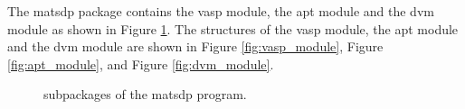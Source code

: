 \documentclass[12pt]{book}
\begin{document}
%
%
%

The matsdp package contains the vasp module, the apt module and the dvm module as shown in Figure \ref{fig:matsdp_main_structure}. The structures of the vasp module, the apt module and the dvm module are shown in Figure \ref{fig:vasp_module}, Figure \ref{fig:apt_module}, and Figure \ref{fig:dvm_module}.

\begin{figure}[htbp]
\centering
{}
\caption{\label{fig:matsdp_main_structure} subpackages of the matsdp program.}
\end{figure}
\end{document}
